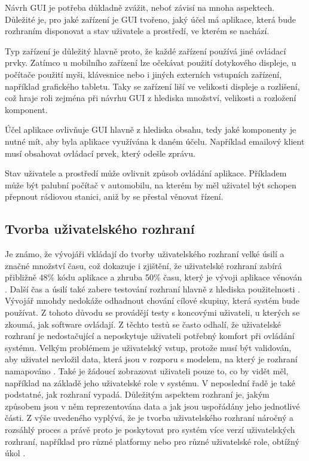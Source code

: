 Návrh GUI je potřeba důkladně zvážit, neboť závisí na mnoha aspektech. Důležité je, pro jaké zařízení je GUI tvořeno, jaký účel má aplikace, která bude rozhraním disponovat a stav uživatele a prostředí, ve kterém se nachází. 

Typ zařízení je důležitý hlavně proto, že každé zařízení používá jiné ovládací prvky. Zatímco u mobilního zařízení lze očekávat použití dotykového displeje, u počítače použití myši, klávesnice nebo i jiných externích vstupních zařízení, například grafického tabletu. Taky se zařízení liší ve velikosti displeje a rozlišení, což hraje roli zejména při návrhu GUI z hlediska množství, velikosti a rozložení komponent.

Účel aplikace ovlivňuje GUI hlavně z hlediska obsahu, tedy jaké komponenty je nutné mít, aby byla aplikace využívána k daném účelu. Například emailový klient musí obsahovat ovládací prvek, který odešle zprávu. 

Stav uživatele a prostředí může ovlivnit způsob ovládání aplikace. Příkladem může být palubní počítač v automobilu, na kterém by měl uživatel být schopen přepnout rádiovou stanici, aniž by se přestal věnovat řízení. 


\subsection{Tvorba uživatelského rozhraní}

Je známo, že vývojáři vkládají do tvorby uživatelského rozhraní velké úsilí a značné množství času, což dokazuje i zjištění, že uživatelské rozhraní zabírá přibližně 48\% kódu aplikace a zhruba 50\% času, který je vývoji aplikace věnován \cite{towards-smart-design}. Další čas a úsilí také zabere testování rozhraní hlavně z hlediska použitelnosti \cite{usability}. Vývojář mnohdy nedokáže odhadnout chování cílové skupiny, která systém bude používat. Z tohoto důvodu se provádějí testy s koncovými uživateli, u kterých se zkoumá, jak software ovládají. Z těchto testů se často odhalí, že uživatelské rozhraní je nedostačující a neposkytuje uživateli potřebný komfort při ovládání systému. Velkým problémem je uživatelský vstup, protože musí být validován, aby uživatel nevložil data, která jsou v rozporu s modelem, na který je rozhraní namapováno \cite{cernyTEA}. Také je žádoucí zobrazovat uživateli pouze to, co by vidět měl, například na základě jeho uživatelské role v systému. V neposlední řadě je také podstatné, jak rozhraní vypadá. Důležitým aspektem rozhraní je, jakým způsobem jsou v něm reprezentována data a jak jsou uspořádány jeho jednotlivé části. Z výše uvedeného vyplývá, že je tvorba uživatelského rozhraní náročný a rozsáhlý proces a právě proto je poskytovat pro systém více verzí uživatelských rozhraní, například pro různé platformy nebo pro různé uživatelské role, obtížný úkol \cite{cernyTEA}.

